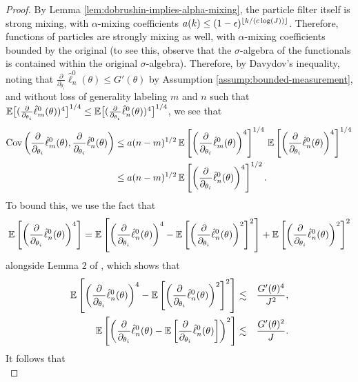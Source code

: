 \begin{proof}
By Lemma \ref{lem:dobrushin-implies-alpha-mixing}, the particle filter itself is strong mixing, with $\alpha$-mixing coefficients $a(k) \leq (1-\epsilon)^{\lfloor k/(c\log(J)) \rfloor}$. Therefore, functions of particles are strongly mixing as well, with $\alpha$-mixing coefficients bounded by the original (to see this, observe that the $\sigma$-algebra of the functionals is contained within the original $\sigma$-algebra). Therefore, by Davydov's inequality, noting that $\frac{\partial}{\partial_{\theta_i}}\hat\ell_n^0(\theta)\leq G'(\theta)$ by Assumption \ref{assump:bounded-measurement}, and without loss of generality labeling $m$ and $n$ such that $\mathbb{E}\big[(\frac{\partial}{\partial_{\theta_i}}\hat\ell_m^0(\theta))^4\big]^{1/4}\leq\mathbb{E}\big[(\frac{\partial}{\partial_{\theta_i}}\hat\ell_n^0(\theta))^4\big]^{1/4}$, we see that
\begin{align}
    \mathrm{Cov}\left(\frac{\partial}{\partial_{\theta_i}}\hat\ell_m^0(\theta), \frac{\partial}{\partial_{\theta_i}}\hat\ell_n^0(\theta)\right) 
    &\leq a(n-m)^{1/2} \, \mathbb{E}\left[\left(\frac{\partial}{\partial_{\theta_i}}\hat\ell_m^0(\theta)\right)^4\right]^{1/4}
    \,
    \mathbb{E}\left[\left(\frac{\partial}{\partial_{\theta_i}}\hat\ell_n^0(\theta)\right)^4\right]^{1/4}\\
    &\leq a(n-m)^{1/2}\, \mathbb{E}\left[\left(\frac{\partial}{\partial_{\theta_i}}\hat\ell_n^0(\theta)\right)^4\right]^{1/2}.
\end{align}
To bound this, we use the fact that 
\begin{equation}
\mathbb{E}\left[\left(\frac{\partial}{\partial_{\theta_i}}\hat\ell_n^0(\theta)\right)^4\right] = \mathbb{E}\left[\left(\frac{\partial}{\partial_{\theta_i}}\hat\ell_n^0(\theta)\right)^4-\mathbb{E}\left[\left(\frac{\partial}{\partial_{\theta_i}}\hat\ell_n^0(\theta)\right)^2\right]^2\right]+\mathbb{E}\left[\left(\frac{\partial}{\partial_{\theta_i}}\hat\ell_n^0(\theta)\right)^2\right]^2
\end{equation}
alongside Lemma 2 of \cite{karjalainen23}, which shows that
\begin{eqnarray}
\mathbb{E}\left[\left(\frac{\partial}{\partial_{\theta_i}}\hat\ell_n^0(\theta)\right)^4-\mathbb{E}\left[\left(\frac{\partial}{\partial_{\theta_i}}\hat\ell_n^0(\theta)\right)^2\right]^2\right] &\lesssim& \frac{G'(\theta)^4}{J^2}, 
\\
\mathbb{E}\left[\left(\frac{\partial}{\partial_{\theta_i}}\hat\ell_n^0(\theta)-\mathbb{E}\left[\frac{\partial}{\partial_{\theta_i}}\hat\ell_n^0(\theta)\right]\right)^2\right] &\lesssim& \frac{G'(\theta)^2}{J}.
\end{eqnarray}
It follows that 
\begin{equation}

\end{equation}
\end{proof}
